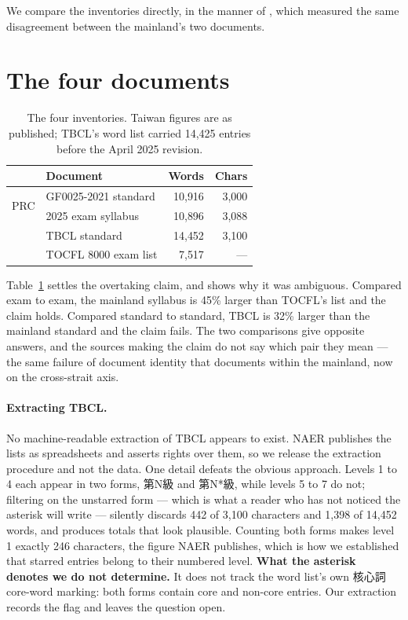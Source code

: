 \documentclass[11pt]{article}
\begin{document}
We compare the inventories directly, in the manner of
\citet{serrano2026whichhsk}, which measured the same disagreement between the
mainland's two documents.

\section{The four documents}
\label{sec:counts}

\begin{table}[t]
\centering\small
\begin{tabular}{@{}llrr@{}}
\toprule
& \textbf{Document} & \textbf{Words} & \textbf{Chars} \\
\midrule
\multirow{2}{*}{PRC}
 & GF0025-2021 standard  & 10{,}916 & 3{,}000 \\
 & 2025 exam syllabus    & 10{,}896 & 3{,}088 \\
\addlinespace
\multirow{2}{*}{TW}
 & TBCL standard         & 14{,}452 & 3{,}100 \\
 & TOCFL 8000 exam list  &  7{,}517 & --- \\
\bottomrule
\end{tabular}
\caption{The four inventories. Taiwan figures are as published; TBCL's word
list carried 14{,}425 entries before the April 2025 revision.}
\label{tab:docs}
\end{table}

Table~\ref{tab:docs} settles the overtaking claim, and shows why it was
ambiguous. Compared exam to exam, the mainland syllabus is 45\% larger than
TOCFL's list and the claim holds. Compared standard to standard, TBCL is 32\%
larger than the mainland standard and the claim fails. The two comparisons give
opposite answers, and the sources making the claim do not say which pair they
mean --- the same failure of document identity that
\citet{serrano2026whichhsk} documents within the mainland, now on the
cross-strait axis.

\paragraph{Extracting TBCL.} No machine-readable extraction of TBCL appears to
exist. NAER publishes the lists as spreadsheets and asserts rights over them, so
we release the extraction procedure and not the data. One detail defeats the
obvious approach. Levels 1 to 4 each appear in two forms, 第N級 and 第N*級,
while levels 5 to 7 do not; filtering on the unstarred form --- which is what a
reader who has not noticed the asterisk will write --- silently discards 442 of
3{,}100 characters and 1{,}398 of 14{,}452 words, and produces totals that look
plausible. Counting both forms makes level 1 exactly 246 characters, the figure
NAER publishes, which is how we established that starred entries belong to
their numbered level. \textbf{What the asterisk denotes we do not determine.} It
does not track the word list's own 核心詞 core-word marking: both forms contain
core and non-core entries. Our extraction records the flag and leaves the
question open.
\end{document}
